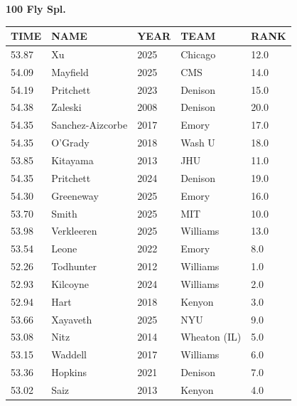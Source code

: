 \begin{table}[H]
\centering
\begin{minipage}[t]{0.6\textwidth}
\centering
\textbf{100 Fly Spl.}\\[0.1cm]
\begin{tabular}{@{}p{1.8cm}p{2.8cm}p{1.2cm}p{1.4cm}p{0.8cm}@{}}
\hline
    \textbf{TIME} & \textbf{NAME} & \textbf{YEAR} & \textbf{TEAM} & \textbf{RANK} \\
\hline
    53.87 & Xu & 2025 & Chicago & 12.0 \\
    54.09 & Mayfield & 2025 & CMS & 14.0 \\
    54.19 & Pritchett & 2023 & Denison & 15.0 \\
    54.38 & Zaleski & 2008 & Denison & 20.0 \\
    54.35 & Sanchez-Aizcorbe & 2017 & Emory & 17.0 \\
    54.35 & O'Grady & 2018 & Wash U & 18.0 \\
    53.85 & Kitayama & 2013 & JHU & 11.0 \\
    54.35 & Pritchett & 2024 & Denison & 19.0 \\
    54.30 & Greeneway & 2025 & Emory & 16.0 \\
    53.70 & Smith & 2025 & MIT & 10.0 \\
    53.98 & Verkleeren & 2025 & Williams & 13.0 \\
    53.54 & Leone & 2022 & Emory & 8.0 \\
    52.26 & Todhunter & 2012 & Williams & 1.0 \\
    52.93 & Kilcoyne & 2024 & Williams & 2.0 \\
    52.94 & Hart & 2018 & Kenyon & 3.0 \\
    53.66 & Xayaveth & 2025 & NYU & 9.0 \\
    53.08 & Nitz & 2014 & Wheaton (IL) & 5.0 \\
    53.15 & Waddell & 2017 & Williams & 6.0 \\
    53.36 & Hopkins & 2021 & Denison & 7.0 \\
    53.02 & Saiz & 2013 & Kenyon & 4.0 \\
\hline
\end{tabular}
\end{minipage}
\end{table}


\newpage




